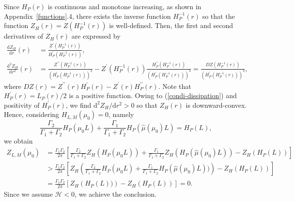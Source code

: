 \documentclass{article}
\theoremstyle{definition}
\begin{document}
Since $H_P(r)$ is continuous and monotone increasing, as shown in Appendix~\ref{functions}.4, there exists the inverse function $H_P^{-1}(r)$ so that the function  
$Z_H(r) = Z(H_P^{-1}(r))$ is well-defined. Then, the first and second derivatives of $Z_H(r)$ are expressed by
\begin{align*}
\frac{\mbox{d}Z_H}{\mbox{d}r}(r) &=  \frac{Z^\prime(H_P^{-1}(r))}{H_P^\prime(H_P^{-1}(r))}, \\
\frac{\mbox{d}^2 Z_H}{\mbox{d}r^2}(r) &= \frac{Z^{\prime\prime}(H_P^{-1}(r))}{\left( H_P^{\prime}(H_P^{-1}(r)) \right)^2} - Z^\prime(H_P^{-1}(r)) \frac{ H^{\prime\prime}_P(H_P^{-1}(r))}{\left( H_P^\prime(H_P^{-1}(r)) \right)^3} = \frac{DZ(H_P^{-1}(r))}{\left( H_P^\prime(H_P^{-1}(r)) \right)^3}, 
\end{align*}
where $DZ(r) = Z^{\prime\prime}(r) H_P^\prime(r) - Z^\prime(r) H^{\prime\prime}_P(r)$. Note that $H^\prime_P(r) = L_P(r) / 2 $ is a positive function. Owing to (\ref{condi-dissipation}) and positivity of $H^\prime_P(r)$, we find $\mbox{d}^2Z_H / \mbox{d}r^2 > 0$ so that $Z_H(r)$ is downward-convex. Hence, considering $H_{L,M}(\mu_0) = 0$, namely  
\begin{equation*}
 \frac{\Gamma_2}{\Gamma_1 + \Gamma_2} H_P( \mu_0 L) + \frac{\Gamma_1}{\Gamma_1 + \Gamma_2} H_P( \widehat{\mu}(\mu_0) L) = H_P(L),
\end{equation*}
we obtain
\begin{align*}
Z_{L, M}(\mu_0) &= \frac{\Gamma_1 \Gamma_2}{2 \pi} \left[ \frac{\Gamma_2}{\Gamma_1 + \Gamma_2} Z_H\left( H_P(\mu_0 L) \right) + \frac{\Gamma_1}{\Gamma_1 + \Gamma_2} Z_H\left( H_P(\widehat{\mu}(\mu_0) L) \right) - Z_H\left( H_P(L) \right) \right] \\
&> \frac{\Gamma_1 \Gamma_2}{2 \pi} \left[ Z_H\left( \frac{\Gamma_2}{\Gamma_1 + \Gamma_2} H_P( \mu_0 L) + \frac{\Gamma_1}{\Gamma_1 + \Gamma_2} H_P( \widehat{\mu}(\mu_0) L) ) \right) - Z_H\left( H_P(L) \right) \right] \\
&= \frac{\Gamma_1 \Gamma_2}{2 \pi} \left[ Z_H\left( H_P(L) ) \right) - Z_H\left( H_P(L) \right) \right] = 0.
\end{align*}
Since we assume $\mathscr{H} <0$, we achieve the conclusion.













\end{document}
